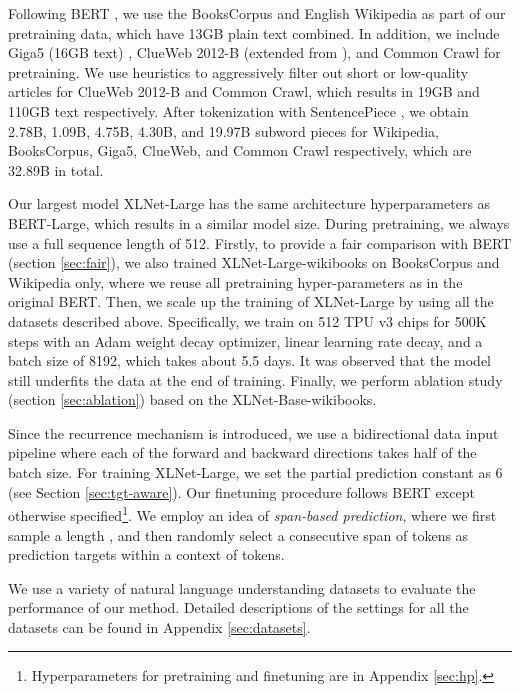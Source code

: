 \documentclass{article}
\begin{document}
Following BERT \cite{devlin2018bert}, we use the BooksCorpus \cite{zhu2015aligning} and English Wikipedia as part of our pretraining data, which have 13GB plain text combined. In addition, we include Giga5 (16GB text) \cite{parker2011english}, ClueWeb 2012-B (extended from \cite{callan2009clueweb09}), and Common Crawl \cite{crawlcommon} for pretraining. We use heuristics to aggressively filter out short or low-quality articles for ClueWeb 2012-B and Common Crawl, which results in 19GB and 110GB text respectively. After tokenization with SentencePiece \cite{kudo2018sentencepiece}, we obtain 2.78B, 1.09B, 4.75B, 4.30B, and 19.97B subword pieces for Wikipedia, BooksCorpus, Giga5, ClueWeb, and Common Crawl respectively, which are 32.89B in total. 

Our largest model XLNet-Large has the same architecture hyperparameters as BERT-Large, which results in a similar model size.
During pretraining, we always use a full sequence length of 512.
Firstly, to provide a fair comparison with BERT (section \ref{sec:fair}), we also trained XLNet-Large-wikibooks on BooksCorpus and Wikipedia only, where we reuse all pretraining hyper-parameters as in the original BERT.
Then, we scale up the training of XLNet-Large by using all the datasets described above.
Specifically, we train on 512 TPU v3 chips for 500K steps with an Adam weight decay optimizer, linear learning rate decay, and a batch size of 8192, which takes about 5.5 days. 
It was observed that the model still underfits the data at the end of training.
Finally, we perform ablation study (section \ref{sec:ablation}) based on the XLNet-Base-wikibooks.


Since the recurrence mechanism is introduced, we use a bidirectional data input pipeline where each of the forward and backward directions takes half of the batch size. 
For training XLNet-Large, we set the partial prediction constant  as 6 (see Section \ref{sec:tgt-aware}).
Our finetuning procedure follows BERT \cite{devlin2018bert} except otherwise specified\footnote{Hyperparameters for pretraining and finetuning are in Appendix \ref{sec:hp}.}.
We employ an idea of \textit{span-based prediction}, where we first sample a length , and then randomly select a consecutive span of  tokens as prediction targets within a context of  tokens.

We use a variety of natural language understanding datasets to evaluate the performance of our method. Detailed descriptions of the settings for all the datasets can be found in Appendix \ref{sec:datasets}.
\end{document}
